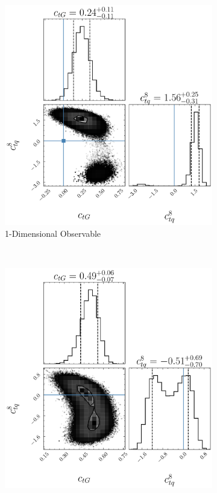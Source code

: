 \documentclass[a4paper,11pt]{article}
\begin{document}
\begin{figure}[H]
    \centering
    \begin{subfigure}[b]{0.45\textwidth}
        \centering
        \includegraphics[width=\textwidth]{plots/ATLAS-ctg-ctq8_1D_2OP.png}
        \caption{1-Dimensional Observable}
        \label{fig:corner_1D_2OP}
    \end{subfigure}
    ~
    \begin{subfigure}[b]{0.45\textwidth}
        \centering
        \includegraphics[width=\textwidth]{plots/ATLAS-ctg-ctq8_2D_2OP.png}

\end{subfigure}
\end{figure}
\end{document}
